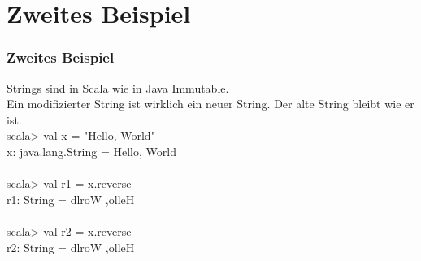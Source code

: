 	\section[Section]{Zweites Beispiel}
	\begin{frame}
		\frametitle{Zweites Beispiel}
		Strings sind in Scala wie in Java Immutable.\\
		Ein modifizierter String ist wirklich ein neuer String. Der
		alte String bleibt wie er ist.\\
		
		scala> val x = "Hello, World"\\
		x: java.lang.String = Hello, World \\
		
		\leavevmode \\
		
		scala> val r1 = x.reverse \\
		r1: String = dlroW ,olleH \\
		
		\leavevmode \\
		
		scala> val r2 = x.reverse \\
		r2: String = dlroW ,olleH \\
	\end{frame}